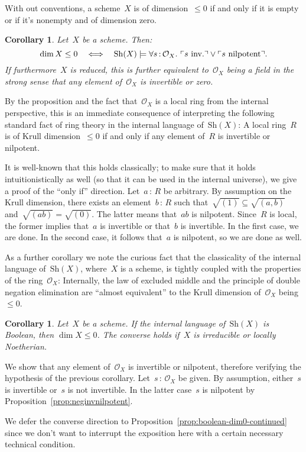 \documentclass[10pt,reqno,a4paper]{amsbook}
\makeatletter
\theoremstyle{definition}
\theoremstyle{plain}
\newtheorem{cor}[defn]{Corollary}
\theoremstyle{remark}
\renewcommand{\O}{\mathcal{O}}
\newcommand{\Sh}{\mathrm{Sh}}
\newcommand{\?}{\,{:}\,}
\renewcommand{\_}{\mathpunct{.}\,}
\newcommand{\speak}[1]{\ulcorner\text{\textnormal{#1}}\urcorner}
\newcommand{\inv}{inv.\@}
\renewenvironment{proof}[1][\proofname]{\par
  \pushQED{\qed}%
  \normalfont \topsep6\p@\@plus6\p@\relax
  \trivlist
  \item[\hskip\labelsep
        \itshape
    #1\@addpunct{.}]\ignorespaces
}{%
  \popQED\endtrivlist\@endpefalse
}
\makeatother
\begin{document}
With out conventions, a scheme~$X$ is of dimension~$\leq 0$ if and only if it
is empty or if it's nonempty and of dimension zero.
\begin{cor}\label{cor:scheme-dimension-zero}
Let~$X$ be a scheme. Then:
\[ \dim X \leq 0 \quad\Longleftrightarrow\quad
  \Sh(X) \models \forall s\?\O_X\_ \speak{$s$ \inv} \vee \speak{$s$ nilpotent}.
  \]
If furthermore~$X$ is reduced, this is further equivalent to~$\O_X$ being a
field in the strong sense that any element of~$\O_X$ is invertible or zero.
\end{cor}
\begin{proof}By the proposition and the fact that~$\O_X$ is a local ring from
the internal perspective, this is an immediate consequence of
interpreting the following standard fact of ring theory in the internal
language of~$\Sh(X)$: A local ring~$R$ is of Krull
dimension~$\leq 0$ if and only if any element of~$R$ is invertible or
nilpotent.

It is well-known that this holds classically; to make sure that it
holds intuitionistically as well (so that it can be used in the internal
universe), we give a proof of the ``only if'' direction. Let~$a \? R$ be
arbitrary. By assumption on the Krull dimension, there exists an element~$b \?
R$ such that~$\sqrt{(1)} \subseteq \sqrt{(a,b)}$ and~$\sqrt{(ab)} =
\sqrt{(0)}$. The latter means that~$ab$ is nilpotent. Since~$R$ is local, the
former implies that~$a$ is invertible or that~$b$ is invertible. In the first
case, we are done. In the second case, it follows that~$a$ is nilpotent, so we
are done as well.
\end{proof}

As a further corollary we note the curious fact that the classicality of the
internal language of~$\Sh(X)$, where~$X$ is a scheme, is tightly coupled with
the properties of the ring~$\O_X$: Internally, the law of excluded middle and
the principle of double negation elimination are ``almost equivalent'' to the
Krull dimension of~$\O_X$ being~$\leq 0$.
\begin{cor}\label{cor:boolean-dim0}
Let~$X$ be a scheme. If the internal language of~$\Sh(X)$ is Boolean, then
$\dim X \leq 0$. The converse holds if~$X$ is irreducible or locally Noetherian.
\end{cor}
\begin{proof}
We show that any element of~$\O_X$ is invertible or nilpotent, therefore
verifying the hypothesis of the previous corollary.
Let~$s\?\O_X$ be given. By assumption, either~$s$ is invertible or~$s$ is not
invertible. In the latter case~$s$ is nilpotent by
Proposition~\ref{prop:neginvnilpotent}.

We defer the converse direction to
Proposition~\ref{prop:boolean-dim0-continued} since we don't want to interrupt
the exposition here with a certain necessary technical condition.
\end{proof}
\end{document}
